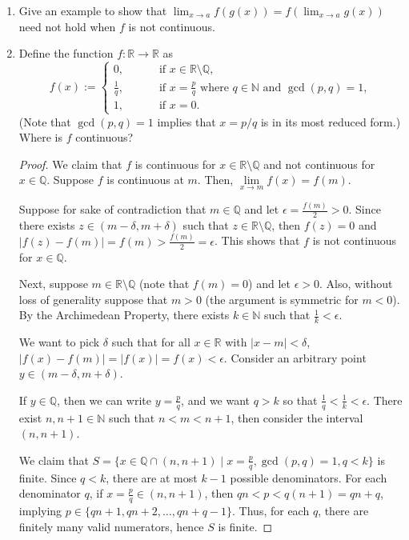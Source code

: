 \documentclass[11pt]{article}
\newcommand{\bbN}{\mathbb{N}}
\newcommand{\bbQ}{\mathbb{Q}}
\newcommand{\bbR}{\mathbb{R}}
\renewcommand{\_}[1]{\underline{ #1 }}
\theoremstyle{definition}
\numberwithin{equation}{subsection}
\begin{document}
\begin{enumerate}
\item
Give an example to show that 
$\displaystyle\lim_{x\longrightarrow a}f(g(x))=f (\displaystyle\lim_{x\longrightarrow a}g(x))$ need not hold when
$f$ is not continuous.

\item
	Define the function $f: \bbR \to \bbR$ as
	\[
		f(x) := 
		\begin{cases}
			0, \qquad &\text{ if } x \in \bbR\setminus \bbQ,\\
			\frac{1}{q}, \qquad &\text{ if } x = \frac{p}{q} \text{ where } q \in \bbN \text{ and } \gcd(p,q) = 1,\\
			1, \qquad & \text{ if } x=0.
		\end{cases}\]
	(Note that $\gcd(p,q) = 1$ implies that $x= p/q$ is in its most reduced form.)  Where is $f$ continuous?

\begin{proof}
We claim that $f$ is continuous for $x \in \bbR \setminus \bbQ$ and not continuous for $x \in \bbQ$. Suppose $f$ is continuous at $m$. Then, $\lim\limits_{x\to m} f(x) = f(m)$.  

Suppose for sake of contradiction that $m \in \bbQ$ and let $\epsilon = \frac{f(m)}{2} > 0$. Since there exists $z \in (m-\delta, m+\delta)$ such that $z \in \bbR \setminus \bbQ$, then $f(z) = 0$ and $|f(z)-f(m)|=f(m)>\frac{f(m)}{2} = \epsilon$. This shows that $f$ is not continuous for $x \in \bbQ$. 

Next, suppose $m \in \bbR \setminus \bbQ$ (note that $f(m)=0$) and let $\epsilon > 0$. Also, without loss of generality suppose that $m>0$ (the argument is symmetric for $m<0$). By the Archimedean Property, there exists $k \in \bbN$ such that $\frac{1}{k}<\epsilon$. 

We want to pick $\delta$ such that for all $x \in \bbR$ with $|x-m|<\delta$, $|f(x)-f(m)|=|f(x)|=f(x)<\epsilon$. Consider an arbitrary point $y \in (m-\delta, m+\delta)$. 

If $y \in \bbQ$, then we can write $y = \frac{p}{q}$, and we want $q>k$ so that $\frac{1}{q}<\frac{1}{k}<\epsilon$. There exist $n, n+1 \in \bbN$ such that $n<m<n+1$, then consider the interval $(n,n+1)$. 

We claim that $S = \{x \in \mathbb{Q} \cap (n,n+1) \mid x = \frac{p}{q}, \gcd(p,q)=1, q < k\}$ is finite. Since $q < k$, there are at most $k-1$ possible denominators. For each denominator $q$, if $x = \frac{p}{q} \in (n,n+1)$, then $qn < p < q(n+1)=qn+q$, implying $p \in \{qn+1, qn+2, \dots, qn+q-1\}$. Thus, for each $q$, there are finitely many valid numerators, hence $S$ is finite.


\end{proof}
\end{enumerate}
\end{document}
